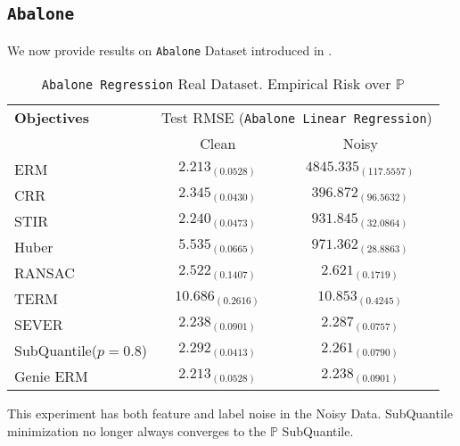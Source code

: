 \documentclass{article} %
\newcommand{\subhead}[1]{\multicolumn{1}{c}{#1}}%
\begin{document}
\begin{appendices}
	\subsection{\texttt{Abalone}}
	We now provide results on \texttt{Abalone} Dataset introduced in \cite{Dua2019}.
	\begin{table}[!h]
		\centering
		\begin{tabular}{lcc}
			\toprule 
			\textbf{Objectives}&\multicolumn{2}{c}{Test RMSE (\texttt{Abalone Linear Regression})}\\                   
			\cmidrule(rl){2-3}
			&\subhead{Clean}& \subhead{Noisy}\\ 
			\midrule
			ERM  &$2.213_{(0.0528)}$&$4845.335_{(117.5557)}$\\
			CRR \cite{bhatia2017}  &$2.345_{(0.0430)}$&$396.872_{(96.5632)}$\\
			STIR \cite{pmlr-v89-mukhoty19a}  &$2.240_{(0.0473)}$&$931.845_{(32.0864)}$\\
			Huber \cite{Huber2009} &$5.535_{(0.0665)}$&$971.362_{(28.8863)}$\\
			RANSAC \cite{RANSAC1981} &$2.522_{(0.1407)}$&$2.621_{(0.1719)}$\\
			TERM \cite{li2020tilted} &$10.686_{(0.2616)}$&$10.853_{(0.4245)}$\\
			SEVER \cite{DiakonikolasKKLSS19} &$\mathbf{2.238_{(0.0901)}}$&$\mathbf{2.287_{(0.0757)}}$\\
			\rowcolor{LightCyan}
			SubQuantile($p = 0.8$) &$\mathbf{2.292_{(0.0413)}}$&$\mathbf{2.261_{(0.0790)}}$\\
			\midrule 
			Genie ERM &$2.213_{(0.0528)}$&$2.238_{(0.0901)}$\\
			\bottomrule
		\end{tabular}
		\caption{\texttt{Abalone Regression} Real Dataset. Empirical Risk over $\mathbb{P}$}
		\label{tab:abalone-regression}
	\end{table}
	This experiment has both feature and label noise in the Noisy Data. SubQuantile minimization no longer always converges to the $\mathbb{P}$ SubQuantile.
	

\end{appendices}
\end{document}
